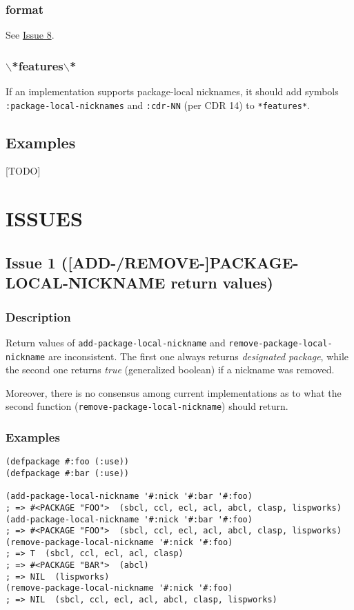 \documentclass[11pt]{article}
\begin{document}
\subsubsection{format}
\label{sec:orgb164efb}
See \hyperref[sec:orgbc62926]{Issue 8}.
\subsubsection{$\backslash$*features$\backslash$*}
\label{sec:org8bf01d2}
If an implementation supports package-local nicknames, it should add symbols
\texttt{:package-local-nicknames} and \texttt{:cdr-NN} (per CDR 14) to \texttt{*features*}.
\subsection{Examples}
\label{sec:org6a49a9c}
[TODO]
\section{ISSUES}
\label{sec:org298932c}

\subsection{Issue 1 ([ADD-/REMOVE-]PACKAGE-LOCAL-NICKNAME return values)}
\label{sec:orgede3d6c}
\subsubsection{Description}
\label{sec:org3c2b081}
Return values of \texttt{add-package-local-nickname} and \texttt{remove-package-local-nickname}
are inconsistent. The first one always returns \emph{designated package}, while the
second one returns \emph{true} (generalized boolean) if a nickname was removed.

Moreover, there is no consensus among current implementations as to what the second
function (\texttt{remove-package-local-nickname}) should return.
\subsubsection{Examples}
\label{sec:orgef28080}
\begin{verbatim}
(defpackage #:foo (:use))
(defpackage #:bar (:use))

(add-package-local-nickname '#:nick '#:bar '#:foo)
; => #<PACKAGE "FOO">  (sbcl, ccl, ecl, acl, abcl, clasp, lispworks)
(add-package-local-nickname '#:nick '#:bar '#:foo)
; => #<PACKAGE "FOO">  (sbcl, ccl, ecl, acl, abcl, clasp, lispworks)
(remove-package-local-nickname '#:nick '#:foo)
; => T  (sbcl, ccl, ecl, acl, clasp)
; => #<PACKAGE "BAR">  (abcl)
; => NIL  (lispworks)
(remove-package-local-nickname '#:nick '#:foo)
; => NIL  (sbcl, ccl, ecl, acl, abcl, clasp, lispworks)
\end{verbatim}
\end{document}
